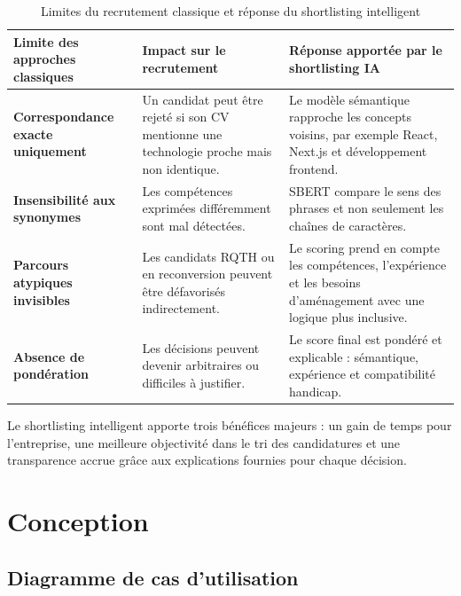 \documentclass[12pt,a4paper]{report}
\newcommand{\tblhead}[1]{\cellcolor{darkblue}\color{white}\bfseries #1}
\newcommand{\tblleft}[1]{\bfseries\color{darkblue} #1}
\begin{document}
\renewcommand{\arraystretch}{1.25}
\begin{table}[H]
\centering
\begin{tabularx}{\textwidth}{|L{3.9cm}|Y|Y|}
\hline
\tblhead{Limite des approches classiques} & \tblhead{Impact sur le recrutement} & \tblhead{Réponse apportée par le shortlisting IA} \\
\hline
\tblleft{Correspondance exacte uniquement} & Un candidat peut être rejeté si son CV mentionne une technologie proche mais non identique. & Le modèle sémantique rapproche les concepts voisins, par exemple React, Next.js et développement frontend. \\
\hline
\tblleft{Insensibilité aux synonymes} & Les compétences exprimées différemment sont mal détectées. & SBERT compare le sens des phrases et non seulement les chaînes de caractères. \\
\hline
\tblleft{Parcours atypiques invisibles} & Les candidats RQTH ou en reconversion peuvent être défavorisés indirectement. & Le scoring prend en compte les compétences, l'expérience et les besoins d'aménagement avec une logique plus inclusive. \\
\hline
\tblleft{Absence de pondération} & Les décisions peuvent devenir arbitraires ou difficiles à justifier. & Le score final est pondéré et explicable : sémantique, expérience et compatibilité handicap. \\
\hline
\end{tabularx}
\caption{Limites du recrutement classique et réponse du shortlisting intelligent}
\label{tab:limites-shortlisting}
\end{table}
\renewcommand{\arraystretch}{1}

\begin{infobox}
Le shortlisting intelligent apporte trois bénéfices majeurs : un gain de temps pour l'entreprise, une meilleure objectivité dans le tri des candidatures et une transparence accrue grâce aux explications fournies pour chaque décision.
\end{infobox}

\section{Conception}

\subsection{Diagramme de cas d'utilisation}
\end{document}
